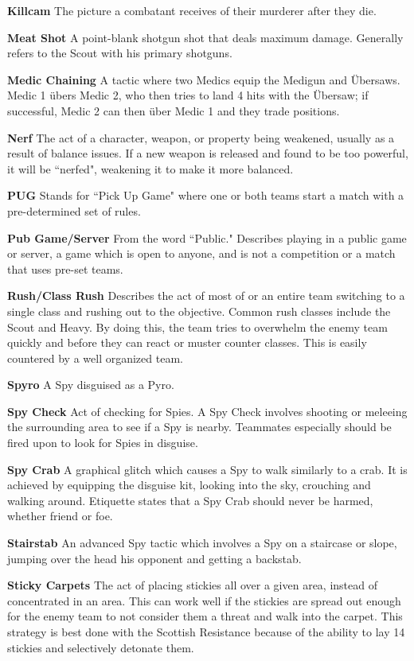 {\bf Killcam} The picture a combatant receives of their murderer after they die.
 
{\bf Meat Shot} A point-blank shotgun shot that deals maximum damage. Generally refers to the Scout with his primary shotguns.

\newpage

{\bf Medic Chaining} A tactic where two Medics equip the Medigun and Übersaws. Medic 1 übers Medic 2, who then tries to land 4 hits with the Übersaw; if successful, Medic 2 can then über Medic 1 and they trade positions.

{\bf Nerf} The act of a character, weapon, or property being weakened, usually as a result of balance issues. If a new weapon is released and found to be too powerful, it will be “nerfed", weakening it to make it more balanced.

{\bf PUG} Stands for “Pick Up Game" where one or both teams start a match with a pre-determined set of rules.

{\bf Pub Game/Server} From the word “Public." Describes playing in a public game or server, a game which is open to anyone, and is not a competition or a match that uses pre-set teams.

{\bf Rush/Class Rush} Describes the act of most of or an entire team switching to a single class and rushing out to the objective. Common rush classes include the Scout and Heavy. By doing this, the team tries to overwhelm the enemy team quickly and before they can react or muster counter classes. This is easily countered by a well organized team.

{\bf Spyro} A Spy disguised as a Pyro.

{\bf Spy Check} Act of checking for Spies. A Spy Check involves shooting or meleeing the surrounding area to see if a Spy is nearby.  Teammates especially should be fired upon to look for Spies in disguise.

{\bf Spy Crab} A graphical glitch which causes a Spy to walk similarly to a crab. It is achieved by equipping the disguise kit, looking into the sky, crouching and walking around. Etiquette states that a Spy Crab should never be harmed, whether friend or foe.

{\bf Stairstab} An advanced Spy tactic which involves a Spy on a staircase or slope, jumping over the head his opponent and getting a backstab.

{\bf Sticky Carpets} The act of placing stickies all over a given area, instead of concentrated in an area. This can work well if the stickies are spread out enough for the enemy team to not consider them a threat and walk into the carpet. This strategy is best done with the Scottish Resistance because of the ability to lay 14 stickies and selectively detonate them.

